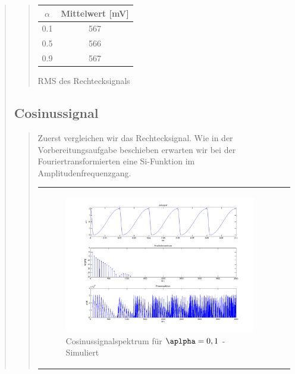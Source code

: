\begin{quote}
\begin{quote}
                     
            \begin{center}
                  \begin{tabular}{|c|c|}
                  \hline
                   $\alpha $ &  Mittelwert [mV] \\ \hline 
                   0.1 &  567 \\ \hline
                   0.5 &  566 \\ \hline
                   0.9 &  567 \\ \hline           
                 \end{tabular}
                       \caption{RMS des Rechtecksignals}
                        \label{tablelabel1}
             \end{center}
        
    \end{quote}
    
    \subsection{Cosinussignal}
    \begin{quote}
        Zuerst vergleichen wir das Rechtecksignal. Wie in der Vorbereitungsaufgabe beschieben erwarten wir bei der
        Fouriertransformierten eine Si-Funktion im Amplitudenfrequenzgang.
        
        
            \begin{center}
            \begin{tabular}{ll}

            \hspace{-12em}
                \begin{minipage}{0.6\textwidth}

                    \begin{figure}[H]
                        \label{fig:}            
                        \includegraphics[scale=0.25]{./Bilder/cos_alpha1.png} %
                        \caption{Cosinussignalspektrum für $\aplpha = 0,1$ - Simuliert}
                    \end{figure}


\end{minipage}
\end{tabular}
\end{center}
\end{quote}
\end{quote}
